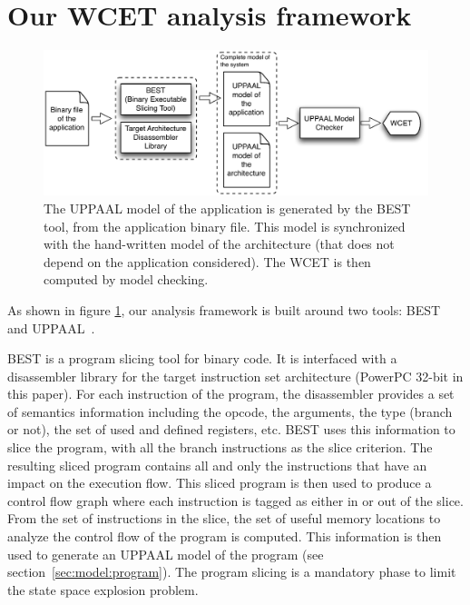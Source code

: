 \section{Our WCET analysis framework}
\label{sec:overview}


\begin{figure}[htbp] %
   \centering
   \includegraphics[width=\columnwidth]{fig/analysisFramework.pdf} 
   \caption{The UPPAAL model of the application is generated by the BEST tool, from the application binary file. This model is synchronized with the hand-written model of the architecture (that does not depend on the application considered). The WCET is then computed by model checking.}
   \label{fig:framework}
\end{figure}

As shown in figure \ref{fig:framework}, our analysis framework is built around two tools: BEST~\cite{wcet16_mangean} and UPPAAL~\cite{Larsen1997}.

BEST is a program slicing tool for binary code.
It is interfaced with a disassembler library for the target instruction set architecture (PowerPC 32-bit in this paper).
For each instruction of the program, the disassembler provides a set of semantics information including the opcode, the arguments, the type (branch or not), the set of used and defined registers, etc. %
BEST uses this information to slice the program, with all the branch
instructions as the slice criterion.
The resulting sliced program contains all and only the instructions that have an
impact on the execution flow.
This sliced program is then used to produce a control flow graph where each instruction is tagged as either in or out of the slice.
From the set of instructions in the slice, the set of useful memory locations to analyze the control flow of the program is computed.
This information is then used to generate an UPPAAL model of the program (see section~\ref{sec:model:program}). The program slicing is a mandatory phase to limit the state space explosion problem.

